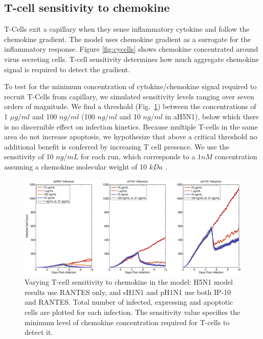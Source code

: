 \documentclass[10pt]{article}
\begin{document}
\subsection*{T-cell sensitivity to chemokine}

T-Cells exit a capillary when they sense inflammatory cytokine and follow the chemokine gradient.  The model uses chemokine gradient as a surrogate for the inflammatory response.  Figure \ref{fig:cycells} shows chemokine concentrated around virus secreting cells.  T-cell sensitivity determines how much aggregate chemokine signal is required to detect the gradient.

To test for the minimum concentration of cytokine/chemokine signal required to recruit T-Cells from capillary, we simulated sensitivity levels ranging over seven orders of magnitude. We find a threshold (Fig.~\ref{fig:sensitivity}) between the concentrations of 1 $\mu g/ml$ and 100 $ng/ml$ (100 $ng/ml$ and 10 $ng/ml$ in aH5N1), below which there is no discernible effect on infection kinetics.  Because multiple T-cells in the same area do not increase apoptosis, we hypothesize that above a critical threshold no additional benefit is conferred by increasing T cell presence.  We use the sensitivity of 10 $ng/mL$ for each run, which corresponds to a $1 nM$ concentration assuming a chemokine molecular weight of 10 $kDa$ \cite{Gao2003}.

\begin{figure}[ht!]
\begin{center}
 \includegraphics[width=\textwidth]{sensitivity}
 \end{center}
\caption{Varying T-cell sensitivity to chemokine in the model: H5N1 model results use RANTES  only, and sH1N1 and pH1N1 use both IP-10 and RANTES. Total number of infected, expressing and apoptotic cells are plotted for each infection.  The sensitivity value specifies the minimum level of chemokine concentration required for T-cells to detect it. } 
 \label{fig:sensitivity}
\end{figure}
\end{document}
